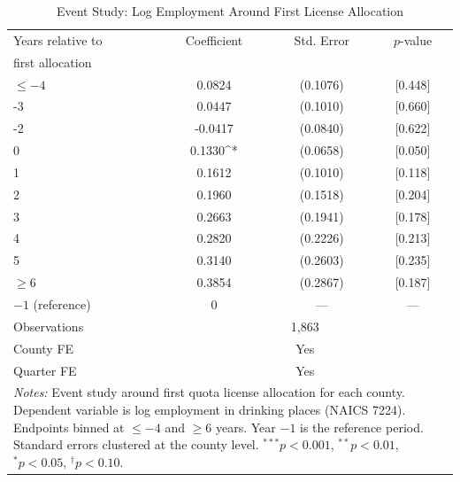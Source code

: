 \begin{table}[htbp]
\centering
\caption{Event Study: Log Employment Around First License Allocation}
\label{tab:event}
\begin{tabular}{lccc}
\hline\hline
Years relative to & Coefficient & Std. Error & $p$-value \\
first allocation & & & \\
\hline
$\leq -4$ & 0.0824 & (0.1076) & [0.448] \\
-3 & 0.0447 & (0.1010) & [0.660] \\
-2 & -0.0417 & (0.0840) & [0.622] \\
0 & 0.1330^{*} & (0.0658) & [0.050] \\
1 & 0.1612 & (0.1010) & [0.118] \\
2 & 0.1960 & (0.1518) & [0.204] \\
3 & 0.2663 & (0.1941) & [0.178] \\
4 & 0.2820 & (0.2226) & [0.213] \\
5 & 0.3140 & (0.2603) & [0.235] \\
$\geq 6$ & 0.3854 & (0.2867) & [0.187] \\
$-1$ (reference) & 0 & --- & --- \\
\hline
Observations & \multicolumn{3}{c}{1,863} \\
County FE & \multicolumn{3}{c}{Yes} \\
Quarter FE & \multicolumn{3}{c}{Yes} \\
\hline\hline
\multicolumn{4}{p{0.8\textwidth}}{\footnotesize\textit{Notes:} Event study around first quota license allocation for each county. Dependent variable is log employment in drinking places (NAICS 7224). Endpoints binned at $\leq -4$ and $\geq 6$ years. Year $-1$ is the reference period. Standard errors clustered at the county level. $^{***}p<0.001$, $^{**}p<0.01$, $^{*}p<0.05$, $^{\dagger}p<0.10$.}
\end{tabular}
\end{table}
